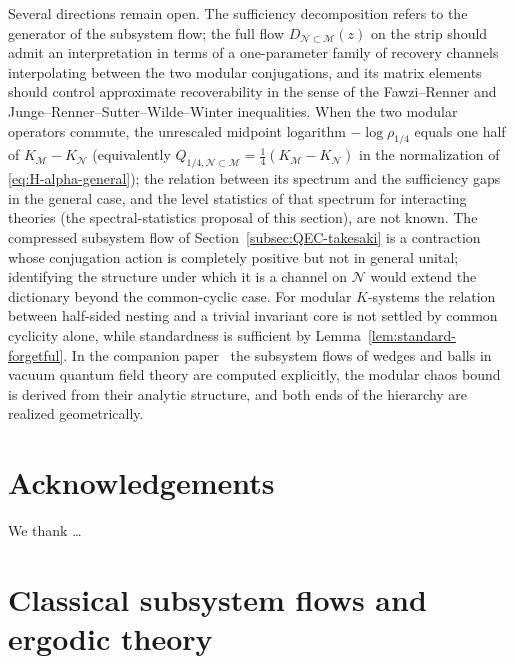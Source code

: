 \documentclass[a4paper,11pt]{article}
\theoremstyle{definition}
\newcommand{\mN}{\mathcal{N}}
\newcommand{\mM}{\mathcal{M}}
\begin{document}
Several directions remain open. The sufficiency decomposition refers to the generator of the subsystem flow; the full flow $D_{\mN\subset\mM}(z)$ on the strip should admit an interpretation in terms of a one-parameter family of recovery channels interpolating between the two modular conjugations, and its matrix elements should control approximate recoverability in the sense of the Fawzi--Renner and Junge--Renner--Sutter--Wilde--Winter inequalities. When the two modular operators commute, the unrescaled midpoint logarithm $-\log\rho_{1/4}$ equals one half of $K_{\mM}-K_{\mN}$ (equivalently $Q_{1/4,\mN\subset\mM}=\tfrac14(K_{\mM}-K_{\mN})$ in the normalization of \eqref{eq:H-alpha-general}); the relation between its spectrum and the sufficiency gaps in the general case, and the level statistics of that spectrum for interacting theories (the spectral-statistics proposal of this section), are not known. The compressed subsystem flow of Section~\ref{subsec:QEC-takesaki} is a contraction whose conjugation action is completely positive but not in general unital; identifying the structure under which it is a channel on $\mN$ would extend the dictionary beyond the common-cyclic case. For modular $K$-systems the relation between half-sided nesting and a trivial invariant core is not settled by common cyclicity alone, while standardness is sufficient by Lemma~\ref{lem:standard-forgetful}. In the companion paper~\cite{companionQFT} the subsystem flows of wedges and balls in vacuum quantum field theory are computed explicitly, the modular chaos bound is derived from their analytic structure, and both ends of the hierarchy are realized geometrically.

\section*{Acknowledgements}
We thank \ldots

\appendix



\section{Classical subsystem flows and ergodic theory}\label{sec:classical}
\end{document}
